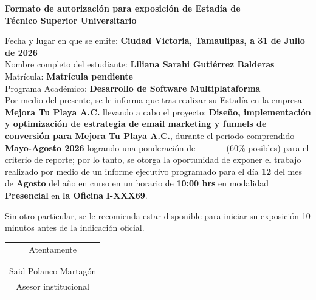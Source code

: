 \documentclass[12pt]{article}
\newcommand{\NombreAlumno}{Liliana Sarahi Gutiérrez Balderas}
\newcommand{\NombreProyecto}{Diseño, implementación y optimización de estrategia de email marketing y funnels de conversión para Mejora Tu Playa A.C.}
\newcommand{\UnidadEconomica}{Mejora Tu Playa A.C.}
\newcommand{\nasesorinstitucional}{Said Polanco Martagón}
\newcommand{\Matricula}{Matrícula pendiente}
\newcommand{\ncuatrimestre}{Mayo-Agosto 2026}
\newcommand{\fechaAutorizacionInforme}{31 de Julio de 2026}
\newcommand{\DiaEvaluacionPesentacion}{12}
\newcommand{\MesEvaluacionPesentacion}{Agosto}
\newcommand{\HoraEvaluacionPesentacion}{10:00 hrs}
\newcommand{\modalidadEvaluacionPesentacion}{Presencial}
\newcommand{\tipoAulaOficinaEnlacePesentacion}{la Oficina}
\newcommand{\AulaEvaluacionOEnlaceMeetPesentacion}{I-XXX69}
\newcommand{\ncarrera}{Desarrollo de Software Multiplataforma}
\begin{document}
\begin{center}
{\Large \textbf{Formato de autorización para exposición de Estadía de}}\\[0.125cm]
{\Large \textbf{Técnico Superior Universitario}}\\[0.25cm]
\end{center}

\noindent
Fecha y lugar en que se emite: \textbf{Ciudad Victoria, Tamaulipas, a \fechaAutorizacionInforme } \\[0.125cm]
Nombre completo del estudiante: \textbf{\NombreAlumno} \\[0.125cm]
Matrícula: \textbf{\Matricula} \\[0.125cm]
Programa Académico: \textbf{\ncarrera} \\[0.25cm]

\noindent
Por medio del presente, se le informa que tras realizar su Estadía en la empresa \textbf{\UnidadEconomica} llevando a cabo el proyecto: \textbf{\NombreProyecto}, durante el periodo comprendido \textbf{\ncuatrimestre} logrando una ponderación de \_\_\_\_  (60\% posibles) para el criterio de reporte; por lo tanto, se otorga la oportunidad de exponer el trabajo realizado por medio de un informe ejecutivo programado para el día \textbf{\DiaEvaluacionPesentacion} del mes de \textbf{\MesEvaluacionPesentacion} del año en curso en un horario de \textbf{\HoraEvaluacionPesentacion} en modalidad \textbf{\modalidadEvaluacionPesentacion} en \textbf{\tipoAulaOficinaEnlacePesentacion} \textbf{\AulaEvaluacionOEnlaceMeetPesentacion}.

\vspace{0.25cm}

\noindent
Sin otro particular, se le recomienda estar disponible para iniciar su exposición 10 minutos antes de la indicación oficial.

\vspace{0.5cm}

\begin{center}
\begin{tabular}{p{10cm}}
\multicolumn{1}{c}{Atentamente} \\
 \\
 \\ \hline
\multicolumn{1}{c}{\nasesorinstitucional} \\
\multicolumn{1}{c}{Asesor institucional} \\
\end{tabular}
\end{center}
\end{document}
